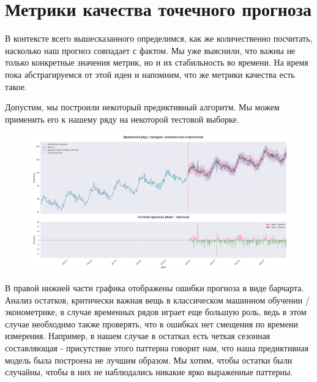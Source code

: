 \section{Метрики качества точечного прогноза}
\label{sec:metrics}

В контексте всего вышесказанного определимся, как же количественно
посчитать, насколько наш прогноз совпадает с фактом. Мы уже выяснили,
что важны не только конкретные значения метрик, но и их стабильность
во времени. На время пока абстрагируемся от этой идеи и напомним, что
же метрики качества есть такое.

Допустим, мы построили некоторый предиктивный алгоритм. Мы можем
применить его к нашему ряду на некоторой тестовой выборке.

\begin{figure}[htb]
  \centering
  \includegraphics[width=1\textwidth]{images/forecast_errors.png}
\end{figure}

В правой нижней части графика отображены ошибки прогноза в виде барчарта.
Анализ остатков, критически важная вещь в классическом машинном
обучении / эконометрике, в случае временных рядов играет еще большую
роль, ведь в этом случае необходимо также проверять, что в ошибках
нет смещения по времени измерения. Например, в нашем случае в
остатках есть четкая сезонная составляющая - присутствие этого
паттерна говорит нам, что наша предиктивная модель была построена не
лучшим образом. Мы хотим, чтобы остатки были случайны, чтобы в них не
наблюдались никакие ярко выраженные паттерны.

